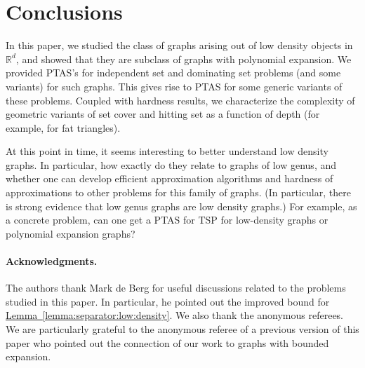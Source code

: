 \documentclass[12pt]{article}
\newcommand{\Term}[1]{\textsf{#1}}
\theoremstyle{remark}\theoremheaderfont{\sf}\theorembodyfont{\upshape}
\numberwithin{figure}{section}\numberwithin{table}{section}\numberwithin{equation}{section}
\newcommand{\HLink}[2]{\hyperref[#2]{#1~\ref*{#2}}}
\newcommand{\HLinkPage}[2]{\hyperref[#2]{#1~\ref*{#2}$_\text{p\pageref{#2}}$}}
\newcommand{\seclab}[1]{\label{sec:#1}} \newcommand{\secref}[1]{\HLink{Section}{sec:#1}} \newcommand{\secrefpage}[1]{\HLinkPage{Section}{sec:#1}}
\newcommand{\lemref}[1]{\HLink{Lemma}{lemma:#1}}
\renewcommand{\Re}{{\mathbb{R}}}
\newcommand{\PTAS}{\Term{PTAS}\xspace}
\newcommand{\si}[1]{#1}
\begin{document}
\section{Conclusions}
\seclab{conclusions}

In this paper, we studied the class of graphs arising out of low
density objects in $\Re^d$, and showed that they are subclass of
graphs with polynomial expansion. We provided \PTAS's for independent
set and dominating set problems (and some variants) for such
graphs. This gives rise to \PTAS for some generic variants of these
problems. Coupled with hardness results, we characterize the
complexity of geometric variants of set cover and hitting set as a
function of depth (for example, for fat triangles).

At this point in time, it seems interesting to better understand low
density graphs. In particular, how exactly do they relate to graphs of
low genus, and whether one can develop efficient approximation
algorithms and hardness of approximations to other problems for this
family of graphs. (In particular, there is strong evidence that low
genus graphs are low density graphs.) For example, as a concrete
problem, can one get a \PTAS for TSP for low-density graphs or
polynomial expansion graphs?

\paragraph{Acknowledgments.}

The authors thank Mark \si{de} Berg for useful discussions related to
the problems studied in this paper. In particular, he pointed out the
improved bound for \lemref{separator:low:density}. We also thank the
anonymous referees. We are particularly grateful to the anonymous
referee of a previous version of this paper who pointed out the
connection of our work to graphs with bounded expansion.

\hypersetup{allcolors=black}
\end{document}

